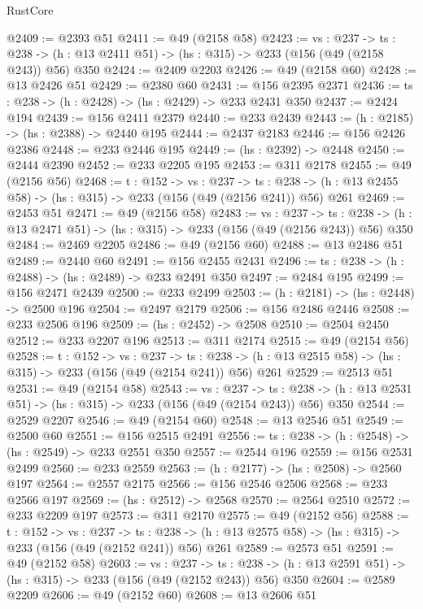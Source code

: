 \begin{lexlean}{RustCore}
\begin{coremodule}
@2409 := @2393 @51
@2411 := @49 (@2158 @58)
@2423 := {vs : @237} ->
  {ts : @238} -> (h : @13 @2411 @51) -> (hs : @315) -> @233 (@156 (@49 (@2158 @243)) @56) @350
@2424 := @2409 @2203
@2426 := @49 (@2158 @60)
@2428 := @13 @2426 @51
@2429 := @2380 @60
@2431 := @156 @2395 @2371
@2436 := {ts : @238} -> (h : @2428) -> (hs : @2429) -> @233 @2431 @350
@2437 := @2424 @194
@2439 := @156 @2411 @2379
@2440 := @233 @2439
@2443 := (h : @2185) -> (hs : @2388) -> @2440 @195
@2444 := @2437 @2183
@2446 := @156 @2426 @2386
@2448 := @233 @2446 @195
@2449 := (hs : @2392) -> @2448
@2450 := @2444 @2390
@2452 := @233 @2205 @195
@2453 := @311 @2178
@2455 := @49 (@2156 @56)
@2468 := {t : @152} ->
  {vs : @237} ->
  {ts : @238} -> (h : @13 @2455 @58) -> (hs : @315) -> @233 (@156 (@49 (@2156 @241)) @56) @261
@2469 := @2453 @51
@2471 := @49 (@2156 @58)
@2483 := {vs : @237} ->
  {ts : @238} -> (h : @13 @2471 @51) -> (hs : @315) -> @233 (@156 (@49 (@2156 @243)) @56) @350
@2484 := @2469 @2205
@2486 := @49 (@2156 @60)
@2488 := @13 @2486 @51
@2489 := @2440 @60
@2491 := @156 @2455 @2431
@2496 := {ts : @238} -> (h : @2488) -> (hs : @2489) -> @233 @2491 @350
@2497 := @2484 @195
@2499 := @156 @2471 @2439
@2500 := @233 @2499
@2503 := (h : @2181) -> (hs : @2448) -> @2500 @196
@2504 := @2497 @2179
@2506 := @156 @2486 @2446
@2508 := @233 @2506 @196
@2509 := (hs : @2452) -> @2508
@2510 := @2504 @2450
@2512 := @233 @2207 @196
@2513 := @311 @2174
@2515 := @49 (@2154 @56)
@2528 := {t : @152} ->
  {vs : @237} ->
  {ts : @238} -> (h : @13 @2515 @58) -> (hs : @315) -> @233 (@156 (@49 (@2154 @241)) @56) @261
@2529 := @2513 @51
@2531 := @49 (@2154 @58)
@2543 := {vs : @237} ->
  {ts : @238} -> (h : @13 @2531 @51) -> (hs : @315) -> @233 (@156 (@49 (@2154 @243)) @56) @350
@2544 := @2529 @2207
@2546 := @49 (@2154 @60)
@2548 := @13 @2546 @51
@2549 := @2500 @60
@2551 := @156 @2515 @2491
@2556 := {ts : @238} -> (h : @2548) -> (hs : @2549) -> @233 @2551 @350
@2557 := @2544 @196
@2559 := @156 @2531 @2499
@2560 := @233 @2559
@2563 := (h : @2177) -> (hs : @2508) -> @2560 @197
@2564 := @2557 @2175
@2566 := @156 @2546 @2506
@2568 := @233 @2566 @197
@2569 := (hs : @2512) -> @2568
@2570 := @2564 @2510
@2572 := @233 @2209 @197
@2573 := @311 @2170
@2575 := @49 (@2152 @56)
@2588 := {t : @152} ->
  {vs : @237} ->
  {ts : @238} -> (h : @13 @2575 @58) -> (hs : @315) -> @233 (@156 (@49 (@2152 @241)) @56) @261
@2589 := @2573 @51
@2591 := @49 (@2152 @58)
@2603 := {vs : @237} ->
  {ts : @238} -> (h : @13 @2591 @51) -> (hs : @315) -> @233 (@156 (@49 (@2152 @243)) @56) @350
@2604 := @2589 @2209
@2606 := @49 (@2152 @60)
@2608 := @13 @2606 @51

\end{coremodule}
\end{lexlean}

